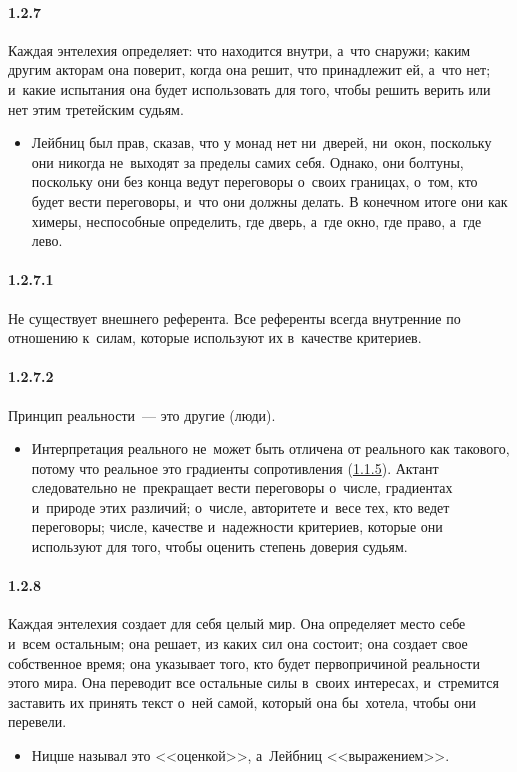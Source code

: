 \paragraph{1.2.7}\hypertarget{par:1.2.7}{} Каждая энтелехия определяет: что находится внутри, а~что снаружи; каким другим акторам она поверит, когда она решит, что принадлежит ей, а~что нет; и~какие испытания она будет использовать для того, чтобы решить верить или нет этим третейским судьям. 
	\begin{itemize}
	\item Лейбниц был прав, сказав, что у монад нет ни~дверей, ни~окон, поскольку они никогда не~выходят за пределы самих себя. Однако, они болтуны, поскольку они без конца ведут переговоры о~своих границах, о~том, кто будет вести переговоры, и~что они должны делать. В конечном итоге они как химеры, неспособные определить, где дверь, а~где окно, где право, а~где лево.
	\end{itemize}

\paragraph{1.2.7.1}\hypertarget{par:1.2.7.1}{} Не существует внешнего референта. Все референты всегда внутренние по отношению к~силам, которые используют их в~качестве критериев.

\paragraph{1.2.7.2}\hypertarget{par:1.2.7.2}{} Принцип реальности~--- это другие (люди).
	\begin{itemize}
	\item Интерпретация реального не~может быть отличена от реального как такового, потому что реальное это градиенты сопротивления (\hyperlink{par:1.1.5}{1.1.5}). Актант следовательно не~прекращает вести переговоры о~числе, градиентах и~природе этих различий; о~числе, авторитете и~весе тех, кто ведет переговоры; числе, качестве и~надежности критериев, которые они используют для того, чтобы оценить степень доверия судьям.
	\end{itemize}

\paragraph{1.2.8}\hypertarget{par:1.2.8}{} Каждая энтелехия создает для себя целый мир. Она определяет место себе и~всем остальным; она решает, из каких сил она состоит; она создает свое собственное время; она указывает того, кто будет первопричиной реальности этого мира. Она переводит все остальные силы в~своих интересах, и~стремится заставить их принять текст о~ней самой, который она бы~хотела, чтобы они перевели.
	\begin{itemize}
	\item Ницше называл это <<оценкой>>, а~Лейбниц <<выражением>>.
	\end{itemize}

